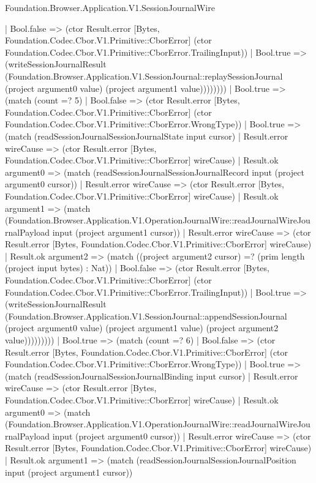\begin{lexlean}{Foundation.Browser.Application.V1.SessionJournalWire}
\begin{semanticmodule}
{                | Bool.false => (ctor Result.error [Bytes, Foundation.Codec.Cbor.V1.Primitive::CborError] (ctor Foundation.Codec.Cbor.V1.Primitive::CborError.TrailingInput))
                | Bool.true => (writeSessionJournalResult (Foundation.Browser.Application.V1.SessionJournal::replaySessionJournal (project argument0 value) (project argument1 value))))))))
      | Bool.true => (match (count =? 5)
        | Bool.false => (ctor Result.error [Bytes, Foundation.Codec.Cbor.V1.Primitive::CborError] (ctor Foundation.Codec.Cbor.V1.Primitive::CborError.WrongType))
        | Bool.true => (match (readSessionJournalSessionJournalState input cursor)
          | Result.error wireCause => (ctor Result.error [Bytes, Foundation.Codec.Cbor.V1.Primitive::CborError] wireCause)
          | Result.ok argument0 => (match (readSessionJournalSessionJournalRecord input (project argument0 cursor))
            | Result.error wireCause => (ctor Result.error [Bytes, Foundation.Codec.Cbor.V1.Primitive::CborError] wireCause)
            | Result.ok argument1 => (match (Foundation.Browser.Application.V1.OperationJournalWire::readJournalWireJournalPayload input (project argument1 cursor))
              | Result.error wireCause => (ctor Result.error [Bytes, Foundation.Codec.Cbor.V1.Primitive::CborError] wireCause)
              | Result.ok argument2 => (match ((project argument2 cursor) =? (prim length (project input bytes) : Nat))
                | Bool.false => (ctor Result.error [Bytes, Foundation.Codec.Cbor.V1.Primitive::CborError] (ctor Foundation.Codec.Cbor.V1.Primitive::CborError.TrailingInput))
                | Bool.true => (writeSessionJournalResult (Foundation.Browser.Application.V1.SessionJournal::appendSessionJournal (project argument0 value) (project argument1 value) (project argument2 value)))))))))
    | Bool.true => (match (count =? 6)
      | Bool.false => (ctor Result.error [Bytes, Foundation.Codec.Cbor.V1.Primitive::CborError] (ctor Foundation.Codec.Cbor.V1.Primitive::CborError.WrongType))
      | Bool.true => (match (readSessionJournalSessionJournalBinding input cursor)
        | Result.error wireCause => (ctor Result.error [Bytes, Foundation.Codec.Cbor.V1.Primitive::CborError] wireCause)
        | Result.ok argument0 => (match (Foundation.Browser.Application.V1.OperationJournalWire::readJournalWireJournalPayload input (project argument0 cursor))
          | Result.error wireCause => (ctor Result.error [Bytes, Foundation.Codec.Cbor.V1.Primitive::CborError] wireCause)
          | Result.ok argument1 => (match (readSessionJournalSessionJournalPosition input (project argument1 cursor))
}
\end{semanticmodule}
\end{lexlean}
